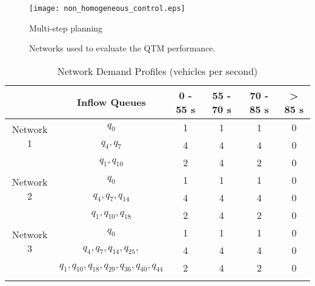 \begin{figure*}[t!]
\centering
\texttt{[image: non\_homogeneous\_control.eps]}
\caption{Multi-step planning}
\label{fig:multiplan}
\end{figure*}


\begin{figure*}[t!]
\centering
\caption{Networks used to evaluate the QTM performance.}
\label{fig:networks}
\end{figure*}

\begin{table}[h]
\caption{Network Demand Profiles (vehicles per second)}
\label{tab:network_demand}
\centering
\begin{tabular}{cccccc}
\toprule
& Inflow Queues & 0 - 55 s & 55 - 70 s & 70 - 85 s & > 85 s\\
\midrule
\multirow{2}{*}{Network 1}&$q_0$ & 1 & 1 & 1 & 0 \\
&$q_4, q_7$ & 4 & 4 & 4 & 0 \\
&$q_1,q_{10}$& 2 & 4 & 2 & 0 \\
\midrule
\multirow{2}{*}{Network 2}&$q_0$ & 1 & 1 & 1 & 0 \\
&$q_4,q_7,q_{14}$& 4 & 4 & 4 & 0 \\
&$q_1, q_{10},q_{18}$ & 2 & 4 & 2 & 0 \\
\midrule
\multirow{2}{*}{Network 3}&$q_0$ & 1 & 1 & 1 & 0 \\
&$q_4,q_7,q_{14},q_{25},$& 4 & 4 & 4 & 0 \\
&$q_1, q_{10},q_{18},q_{29},q_{36},q_{40},q_{44}$ & 2 & 4 & 2 & 0 \\
\bottomrule\\
\end{tabular}
\end{table}




